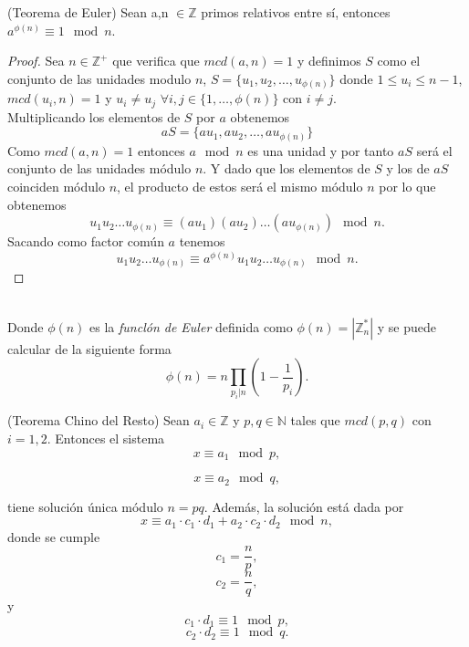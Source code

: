 \begin{teorema}
	(Teorema de Euler) Sean a,n $\in \mathbb{Z}$ primos relativos entre sí, entonces $a^{\phi(n)}\equiv 1 \mod n$.
\end{teorema}\vspace*{-10mm}
\begin{proof}
		Sea $n\in \mathbb{Z^+}$ que verifica que $mcd(a,n)=1$ y definimos $S$ como el conjunto de las unidades modulo $n$, $S=\{u_1,u_2,\dots,u_{\phi(n)}\}$ donde $1\leq u_i\leq n-1$, $mcd(u_i,n)=1$ y $u_i\neq u_j$ $\forall i,j \in \{1,\dots,\phi(n)\}$ con $ i\neq j$.\\
	Multiplicando  los elementos de $S$ por $a$ obtenemos 
	$$
		aS=\{au_1,au_2,\dots,au_{\phi(n)}\}
	$$
	Como $mcd(a,n)=1$ entonces $a\mod n$ es una unidad y por tanto $aS$ será el conjunto de las unidades módulo $n$. Y dado que los elementos de $S$ y los de $aS$ coinciden módulo $n$, el producto de estos será el mismo módulo $n$ por lo que obtenemos 
	$$
		u_1u_2\dots u_{\phi(n)} \equiv (au_1)(au_2)\dots (au_{\phi(n)})\mod n.
	$$
	Sacando como factor común $a$ tenemos 
	$$
		u_1u_2\dots u_{\phi(n)} \equiv a^{\phi(n)}u_1u_2\dots u_{\phi(n)}\mod n.
	$$
\end{proof}\\
Donde $\phi(n)$ es la \emph{funclón de Euler} definida como $\phi(n)=|\mathbb{Z}^*_n|$ y se puede calcular de la siguiente forma $$\phi(n)=n\prod_{p_i|n}\left(1-\frac{1}{p_i}\right).$$

\begin{teorema}
		(Teorema Chino del Resto) Sean $a_i\in \mathbb{Z}$ y $p,q \in \mathbb{N}$ tales que $mcd(p,q)$ con $i = 1,2$. Entonces el sistema
		$$
			x\equiv a_1 \mod p,
		$$\vspace*{-10mm}

		$$
			x\equiv a_2 \mod q,
		$$

	tiene solución única módulo $n=pq$. Además, la solución está dada por
	$$
		x\equiv a_1\cdot c_1\cdot d_1 +a_2\cdot c_2\cdot d_2 \mod n,
	$$
	donde se cumple
	$$
		c_1=\frac{n}{p},
	$$
	$$
		c_2=\frac{n}{q},
	$$
		y
	$$
		c_1\cdot d_1 \equiv 1 \mod p,
	$$
	$$
		c_2\cdot d_2 \equiv 1 \mod q.
	$$
	
\end{teorema}

